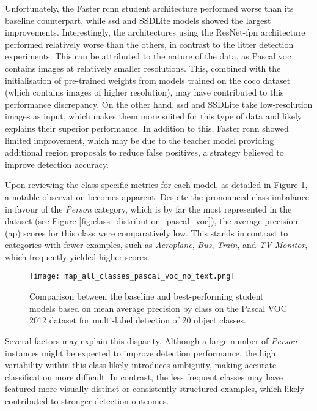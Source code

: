 Unfortunately, the Faster \gls{rcnn} student architecture performed worse than its baseline counterpart, while \gls{ssd} and SSDLite models showed the largest improvements. Interestingly, the architectures using the ResNet-\gls{fpn} architecture performed relatively worse than the others, in contrast to the litter detection experiments. This can be attributed to the nature of the data, as Pascal \gls{voc} contains images at relatively smaller resolutions. This, combined with the initialisation of pre-trained weights from models trained on the \gls{coco} dataset (which contains images of higher resolution), may have contributed to this performance discrepancy. On the other hand, \gls{ssd} and SSDLite take low-resolution images as input, which makes them more suited for this type of data and likely explains their superior performance. In addition to this, Faster \gls{rcnn} showed limited improvement, which may be due to the teacher model providing additional region proposals to reduce false positives, a strategy believed to improve detection accuracy.

Upon reviewing the class-specific metrics for each model, as detailed in Figure \ref{fig:pascal_voc_per_class}, a notable observation becomes apparent.
 Despite the pronounced class imbalance in favour of the \textit{Person} category, which is by far the most represented in the dataset (see Figure \ref{fig:class_distribution_pascal_voc}), the average precision (\gls{ap}) scores for this class were comparatively low. This stands in contrast to categories with fewer examples, such as \textit{Aeroplane}, \textit{Bus}, \textit{Train}, and \textit{TV Monitor}, which frequently yielded higher scores.

\begin{figure}[!htbp]
    \centering
    \texttt{[image: map\_all\_classes\_pascal\_voc\_no\_text.png]}
    \caption{Comparison between the baseline and best-performing student models based on mean average precision by class on the Pascal VOC 2012 dataset for multi-label detection of 20 object classes.}
    \label{fig:pascal_voc_per_class}
\end{figure}

Several factors may explain this disparity. Although a large number of \textit{Person} instances might be expected to improve detection performance, the high variability within this class likely introduces ambiguity, making accurate classification more difficult. In contrast, the less frequent classes may have featured more visually distinct or consistently structured examples, which likely contributed to stronger detection outcomes.

